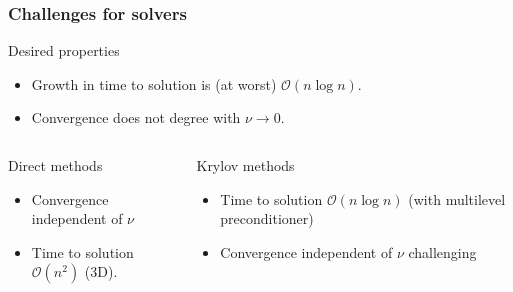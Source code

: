 \documentclass[presentation]{beamer}
\newcommand{\cmark}{\ding{51}}
\newcommand{\xmark}{\ding{55}}
\begin{document}
\begin{frame}
  \frametitle{Challenges for solvers}
  \begin{block}{Desired properties}
    \begin{itemize}
    \item Growth in time to solution is (at worst)
      $\mathcal{O}(n\log n)$.
    \item Convergence does not degree with $\nu \to 0$.
    \end{itemize}
  \end{block}
  \begin{columns}[t]
    \begin{column}{0.5\textwidth}
      \begin{block}{Direct methods}
        \begin{itemize}
        \item[\cmark] Convergence independent of $\nu$
        \item[\xmark] Time to solution $\mathcal{O}(n^2)$ (3D).
        \end{itemize}
      \end{block}
    \end{column}
    \begin{column}{0.5\textwidth}
      \begin{block}{Krylov methods}
        \begin{itemize}
        \item[\cmark] Time to solution $\mathcal{O}(n \log n)$ (with
          multilevel preconditioner)
        \item[\xmark] Convergence independent of $\nu$ challenging
        \end{itemize}
      \end{block}
    \end{column}
  \end{columns}
\end{frame}
\end{document}

